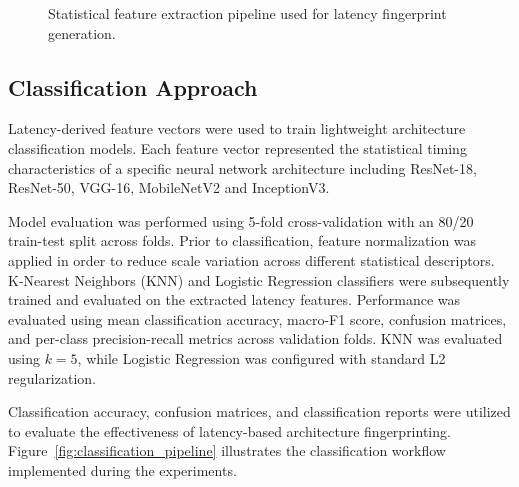 \documentclass[conference]{IEEEtran}
\begin{document}
\begin{figure}[t]
\centering
{}
\caption{Statistical feature extraction pipeline used for latency fingerprint generation.}
\label{fig:feature_pipeline}
\end{figure}

\subsection{Classification Approach}

Latency-derived feature vectors were used to train lightweight architecture classification models. Each feature vector represented the statistical timing characteristics of a specific neural network architecture including ResNet-18, ResNet-50, VGG-16, MobileNetV2 and InceptionV3.

Model evaluation was performed using 5-fold cross-validation with an 80/20 train-test split across folds. Prior to classification, feature normalization was applied in order to reduce scale variation across different statistical descriptors. K-Nearest Neighbors (KNN) and Logistic Regression classifiers were subsequently trained and evaluated on the extracted latency features. Performance was evaluated using mean classification accuracy, macro-F1 score, confusion matrices, and per-class precision-recall metrics across validation folds. KNN was evaluated using $k=5$, while Logistic Regression was configured with standard L2 regularization.

Classification accuracy, confusion matrices, and classification reports were utilized to evaluate the effectiveness of latency-based architecture fingerprinting. Figure~\ref{fig:classification_pipeline} illustrates the classification workflow implemented during the experiments.
\end{document}
